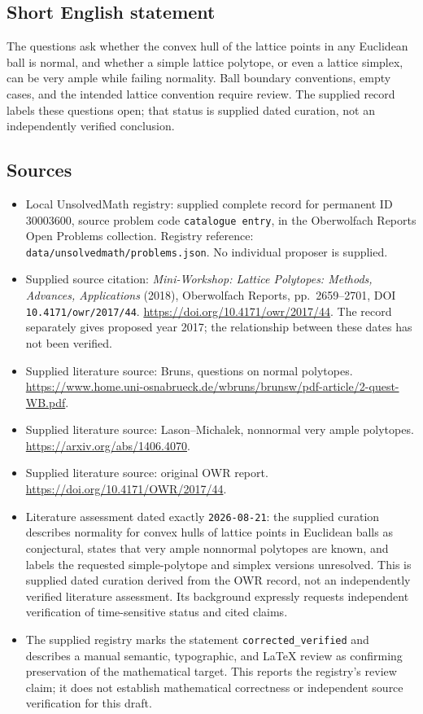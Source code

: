 \documentclass[11pt]{article}
\begin{document}
\subsection{Short English statement}
The questions ask whether the convex hull of the lattice points in any Euclidean ball is normal, and whether a simple lattice polytope, or even a lattice simplex, can be very ample while failing normality. Ball boundary conventions, empty cases, and the intended lattice convention require review. The supplied record labels these questions open; that status is supplied dated curation, not an independently verified conclusion.
\subsection{Sources}
\begin{itemize}
\item Local UnsolvedMath registry: supplied complete record for permanent ID \(30003600\), source problem code \texttt{catalogue entry}, in the Oberwolfach Reports Open Problems collection. Registry reference: \texttt{data/unsolvedmath/problems.json}. No individual proposer is supplied.
\item Supplied source citation: \emph{Mini-Workshop: Lattice Polytopes: Methods, Advances, Applications} (2018), Oberwolfach Reports, pp.~2659--2701, DOI \texttt{10.4171/owr/2017/44}. \url{https://doi.org/10.4171/owr/2017/44}. The record separately gives proposed year 2017; the relationship between these dates has not been verified.
\item Supplied literature source: Bruns, questions on normal polytopes. \url{https://www.home.uni-osnabrueck.de/wbruns/brunsw/pdf-article/2-quest-WB.pdf}.
\item Supplied literature source: Lason--Michalek, nonnormal very ample polytopes. \url{https://arxiv.org/abs/1406.4070}.
\item Supplied literature source: original OWR report. \url{https://doi.org/10.4171/OWR/2017/44}.
\item Literature assessment dated exactly \texttt{2026-08-21}: the supplied curation describes normality for convex hulls of lattice points in Euclidean balls as conjectural, states that very ample nonnormal polytopes are known, and labels the requested simple-polytope and simplex versions unresolved. This is supplied dated curation derived from the OWR record, not an independently verified literature assessment. Its background expressly requests independent verification of time-sensitive status and cited claims.
\item The supplied registry marks the statement \texttt{corrected\_verified} and describes a manual semantic, typographic, and LaTeX review as confirming preservation of the mathematical target. This reports the registry's review claim; it does not establish mathematical correctness or independent source verification for this draft.
\end{itemize}
\end{document}
